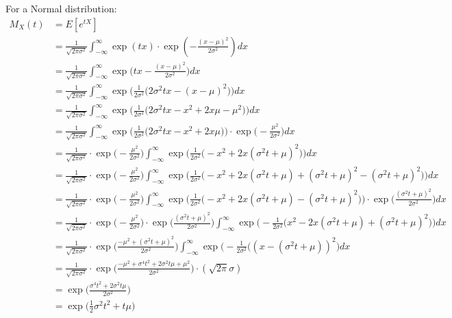 \item For a Normal distribution:
{\setlength{\jot}{9pt}
\begin{align*}
M_{X} (t) &= E[e^{tX}] \\
&= \frac{1}{\sqrt{2\pi\sigma^2}} \int_{- \infty}^{\infty} \exp(tx) \cdot \exp(-\frac{(x - \mu)^2}{2\sigma^2})dx \\
&= \frac{1}{\sqrt{2\pi\sigma^2}} \int_{- \infty}^{\infty} \exp \Big( tx -\frac{(x - \mu)^2}{2\sigma^2} \Big)dx \\
&= \frac{1}{\sqrt{2\pi\sigma^2}} \int_{- \infty}^{\infty} \exp \Big(\frac{1}{2\sigma^2}
\Big( 2\sigma^2 tx - (x - \mu)^2 \Big) \Big)dx \\
&= \frac{1}{\sqrt{2\pi\sigma^2}} \int_{- \infty}^{\infty} \exp \Big(\frac{1}{2\sigma^2}
\Big( 2\sigma^2 tx - x^2 +2 x \mu - \mu^2 \Big) \Big) dx \\
&= \frac{1}{\sqrt{2\pi\sigma^2}} \int_{- \infty}^{\infty} \exp \Big(\frac{1}{2\sigma^2}
\Big( 2\sigma^2 tx - x^2 +2 x \mu \Big) \Big) \cdot \exp \Big( - \frac{\mu^2}{2\sigma^2} \Big) dx \\
&= \frac{1}{\sqrt{2\pi\sigma^2}} \cdot \exp \Big( - \frac{\mu^2}{2\sigma^2} \Big)
\int_{- \infty}^{\infty} \exp \Big(\frac{1}{2\sigma^2} \Big( - x^2 + 2x (\sigma^2 t +\mu)^2 \Big) \Big) dx \\
&= \frac{1}{\sqrt{2\pi\sigma^2}} \cdot \exp \Big( - \frac{\mu^2}{2\sigma^2} \Big) \int_{- \infty}^{\infty} \exp \Big(
\frac{1}{2\sigma^2} \Big( - x^2 + 2x (\sigma^2 t +\mu) + (\sigma^2 t +\mu)^2 - (\sigma^2 t +\mu)^2 \Big) \Big) dx \\
&= \frac{1}{\sqrt{2\pi\sigma^2}} \cdot \exp \Big( - \frac{\mu^2}{2\sigma^2} \Big) \int_{- \infty}^{\infty} \exp \Big(
\frac{1}{2\sigma^2} \Big( - x^2 + 2x (\sigma^2 t +\mu) - (\sigma^2 t +\mu)^2 \Big) \Big) \cdot
\exp \Big( \frac{(\sigma^2 t +\mu)^2}{2 \sigma^2} \Big) dx \\
&= \frac{1}{\sqrt{2\pi\sigma^2}} \cdot \exp \Big( - \frac{\mu^2}{2\sigma^2} \Big) \cdot \exp \Big(
\frac{(\sigma^2 t +\mu)^2}{2 \sigma^2} \Big) \int_{- \infty}^{\infty} \exp \Big(- \frac{1}{2\sigma^2}
\Big( x^2 - 2x (\sigma^2 t  +\mu) + (\sigma^2 t +\mu)^2 \Big) \Big) dx \\
&= \frac{1}{\sqrt{2\pi\sigma^2}} \cdot \exp \Big( \frac{ -\mu^2 + (\sigma^2 t +\mu)^2}{2 \sigma^2} \Big)
\int_{-\infty}^{\infty} \exp \Big(- \frac{1}{2\sigma^2} \Big( (x - (\sigma^2 t + \mu))^2 \Big) dx \\
&= \frac{1}{\sqrt{2\pi\sigma^2}} \cdot \exp \Big( \frac{ -\mu^2
+ \sigma^4 t^2 + 2 \sigma^2 t \mu + \mu^2}{2 \sigma^2} \Big) \cdot (\sqrt{2\pi} \sigma) \\
&= \exp \Big( \frac{\sigma^4 t^2 + 2 \sigma^2 t \mu}{2 \sigma^2} \Big) \\
&= \exp \Big(\frac{1}{2} \sigma^2 t^2 + t \mu \Big)
\end{align*}}

